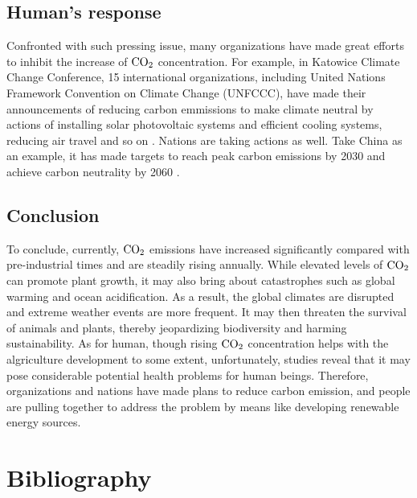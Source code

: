 \documentclass[12pt,a4paper]{article}
\begin{document}
    \subsection{Human's response}
    Confronted with such pressing issue, many organizations have made great efforts to inhibit the increase of $\ce{CO2}$ concentration. For example, in Katowice Climate Change Conference, 15 international organizations, including United Nations Framework Convention on Climate Change (UNFCCC), have made their announcements of reducing carbon emmissions to make climate neutral by actions of installing solar photovoltaic systems and efficient cooling systems, reducing air travel and so on \autocite{unfccc_15_2018}. Nations are taking actions as well. Take China as an example, it has made targets to reach peak carbon emissions by 2030 and achieve carbon neutrality by 2060 \autocite{xinhua_responding_2021}.
    
    \subsection{Conclusion}
    To conclude, currently, $\ce{CO2}$ emissions have increased significantly compared with pre-industrial times and are steadily rising annually. While elevated levels of $\ce{CO2}$ can promote plant growth, it may also bring about catastrophes such as global warming and ocean acidification. As a result, the global climates are disrupted and extreme weather events are more frequent. It may then threaten the survival of animals and plants, thereby jeopardizing biodiversity and harming sustainability. As for human, though rising $\ce{CO2}$ concentration helps with the algriculture development to some extent, unfortunately, studies reveal that it may pose considerable potential health problems for human beings. Therefore, organizations and nations have made plans to reduce carbon emission, and people are pulling together to address the problem by means like developing renewable energy sources.

    
    \newpage
    \section{Bibliography}
    \printbibliography[heading=none]
    
\end{document}
